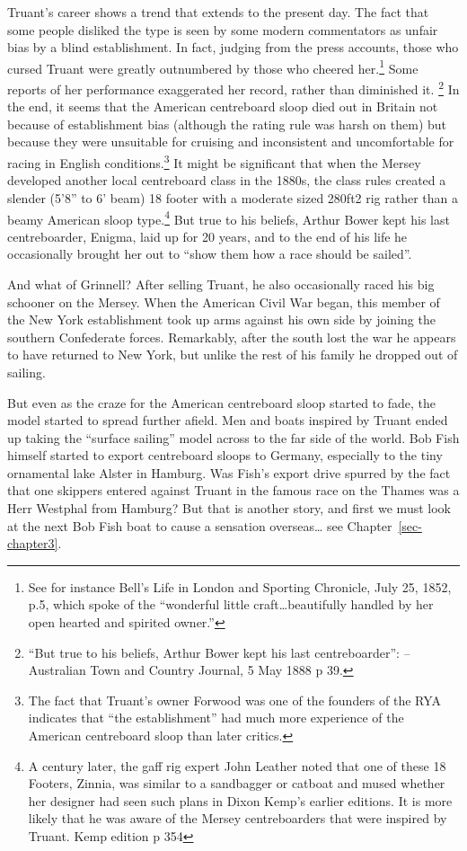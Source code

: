 \documentclass[
  letterpaper,
]{scrbook}
\begin{document}
Truant's career shows a trend that extends to the present day. The fact
that some people disliked the type is seen by some modern commentators
as unfair bias by a blind establishment. In fact, judging from the press
accounts, those who cursed Truant were greatly outnumbered by those who
cheered her.\footnote{See for instance Bell's Life in London and
  Sporting Chronicle, July 25, 1852, p.5, which spoke of the ``wonderful
  little craft\ldots beautifully handled by her open hearted and
  spirited owner.''} Some reports of her performance exaggerated her
record, rather than diminished it. \footnote{``But true to his beliefs,
  Arthur Bower kept his last centreboarder'': -- Australian Town and
  Country Journal, 5 May 1888 p 39.} In the end, it seems that the
American centreboard sloop died out in Britain not because of
establishment bias (although the rating rule was harsh on them) but
because they were unsuitable for cruising and inconsistent and
uncomfortable for racing in English conditions.\footnote{The fact that
  Truant's owner Forwood was one of the founders of the RYA indicates
  that ``the establishment'' had much more experience of the American
  centreboard sloop than later critics.} It might be significant that
when the Mersey developed another local centreboard class in the 1880s,
the class rules created a slender (5'8'' to 6' beam) 18 footer with a
moderate sized 280ft2 rig rather than a beamy American sloop
type.\footnote{A century later, the gaff rig expert John Leather noted
  that one of these 18 Footers, Zinnia, was similar to a sandbagger or
  catboat and mused whether her designer had seen such plans in Dixon
  Kemp's earlier editions. It is more likely that he was aware of the
  Mersey centreboarders that were inspired by Truant. Kemp edition p 354}
But true to his beliefs, Arthur Bower kept his last centreboarder,
Enigma, laid up for 20 years, and to the end of his life he occasionally
brought her out to ``show them how a race should be sailed''.

And what of Grinnell? After selling Truant, he also occasionally raced
his big schooner on the Mersey. When the American Civil War began, this
member of the New York establishment took up arms against his own side
by joining the southern Confederate forces. Remarkably, after the south
lost the war he appears to have returned to New York, but unlike the
rest of his family he dropped out of sailing.

But even as the craze for the American centreboard sloop started to
fade, the model started to spread further afield. Men and boats inspired
by Truant ended up taking the ``surface sailing'' model across to the
far side of the world. Bob Fish himself started to export centreboard
sloops to Germany, especially to the tiny ornamental lake Alster in
Hamburg. Was Fish's export drive spurred by the fact that one skippers
entered against Truant in the famous race on the Thames was a Herr
Westphal from Hamburg? But that is another story, and first we must look
at the next Bob Fish boat to cause a sensation overseas\ldots{} see
Chapter~\ref{sec-chapter3}.
\end{document}
